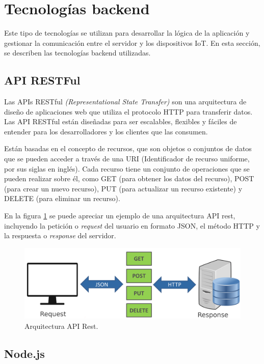 \section{Tecnologías backend}
\label{sec:backend}

Este tipo de tecnologías se utilizan para desarrollar la lógica de la aplicación y gestionar la comunicación entre el servidor y los dispositivos IoT. En esta sección, se describen las tecnologías backend utilizadas.

\subsection{API RESTFul}
\label{subsec:apis}

Las APIs RESTful \cite{fielding_architectural_2000} \textit{(Representational State Transfer)} son una arquitectura de diseño de aplicaciones web que utiliza el protocolo HTTP para transferir datos. Las API RESTful están diseñadas para ser escalables, flexibles y fáciles de entender para los desarrolladores y los clientes que las consumen.

Están basadas en el concepto de recursos, que son objetos o conjuntos de datos que se pueden acceder a través de una URI (Identificador de recurso uniforme, por sus siglas en inglés). Cada recurso tiene un conjunto de operaciones que se pueden realizar sobre él, como GET (para obtener los datos del recurso), POST (para crear un nuevo recurso), PUT (para actualizar un recurso existente) y DELETE (para eliminar un recurso).

En la figura \ref{fig:apirest} se puede apreciar un ejemplo de una arquitectura API rest, incluyendo la petición o \textit{request} del usuario en formato JSON, el método HTTP y la respuesta o \textit{response} del servidor.

\begin{figure}[ht]
	\centering
	\includegraphics[scale=.15]{./Figures/apirest.png}
	\caption{Arquitectura API Rest.}
	\label{fig:apirest}
\end{figure}

\subsection{Node.js}
\label{subsec:nodejs}


